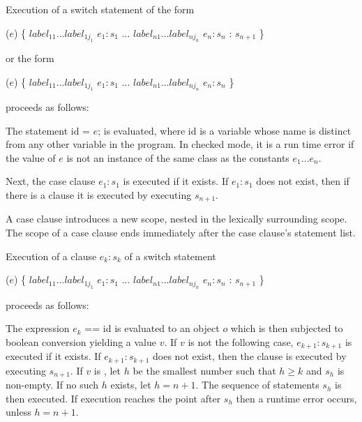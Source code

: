 \documentclass{article}
\newcommand{\code}[1]{{\sf #1}}
\begin{document}
\LMHash{}
Execution of a switch statement of the form

\begin{dartCode}
\SWITCH{} ($e$) \{ 
   \CASE{} $label_{11} \ldots label_{1j_1}$ $e_1: s_1$ 
   $\ldots$  
   \CASE{} $label_{n1} \ldots label_{nj_n}$ $e_n: s_n$ 
   \DEFAULT{}: $s_{n+1}$ 
\}
\end{dartCode}
 
or the form 
 
\begin{dartCode}
\SWITCH{} ($e$) \{ 
   \CASE{} $label_{11} \ldots label_{1j_1}$ $e_1: s_1$
   $\ldots$  
   \CASE{} $label_{n1} \ldots label_{nj_n}$ $e_n: s_n$ 
\}
\end{dartCode}

proceeds as follows:

\LMHash{}
The statement \code{\VAR{} id = $e$;} is evaluated, where \code{id} is a variable whose name is distinct from any other variable in the program. In checked mode, it is a run time error if the value of $e$ is not an instance of the same class as the constants $e_1 \ldots e_n$. 


\LMHash{}
Next, the case clause \CASE{} $e_{1}: s_{1}$ is executed if it exists. If \CASE{} $e_{1}: s_{1}$ does not exist, then if there is a  \DEFAULT{} clause it is executed by executing $s_{n+1}$.

\LMHash{}
A case clause introduces a new scope, nested in the lexically surrounding scope. The scope of a case clause ends immediately after the case clause's statement list.

\LMHash{}
Execution of a \CASE{} clause \CASE{} $e_{k}: s_{k}$ of a  switch statement  

\begin{dartCode}
\SWITCH{} ($e$) \{ 
   \CASE{} $label_{11} \ldots label_{1j_1}$ $e_1: s_1$ 
   $\ldots$  
   \CASE{} $label_{n1} \ldots label_{nj_n}$ $e_n: s_n$ 
   \DEFAULT{}: $s_{n+1}$ 
\}
\end{dartCode}

proceeds as follows:

\LMHash{}
The expression \code{$e_k$ == id} is evaluated to an object $o$ which is then subjected to boolean conversion yielding a value $v$. 
If $v$ is not  \TRUE{} the following case,  \CASE{} $e_{k+1}: s_{k+1}$ is executed if it exists. If  \CASE{} $e_{k+1}: s_{k+1}$ does not exist, then the \DEFAULT{} clause is executed by executing $s_{n+1}$.
If $v$ is \TRUE{},   let $h$ be the smallest number such that $h \ge k$ and $s_h$ is non-empty. If no such $h$ exists, let $h = n + 1$. The  sequence of statements $s_h$ is then executed.
If execution reaches the point after $s_h$  then  a runtime error occurs, unless $h = n+1$.
\end{document}
